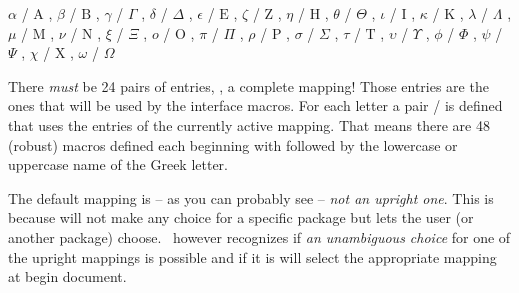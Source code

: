 \documentclass[load-preamble+]{cnltx-doc}
\begin{document}
\begin{sourcecode}
    {
      \ensuremath{\alpha}   / \ensuremath{\mathrm{A}} , %
      \ensuremath{\beta}    / \ensuremath{\mathrm{B}} , %
      \ensuremath{\gamma}   / \ensuremath{\Gamma} ,     %
      \ensuremath{\delta}   / \ensuremath{\Delta} ,     %
      \ensuremath{\epsilon} / \ensuremath{\mathrm{E}} , %
      \ensuremath{\zeta}    / \ensuremath{\mathrm{Z}} , %
      \ensuremath{\eta}     / \ensuremath{\mathrm{H}} , %
      \ensuremath{\theta}   / \ensuremath{\Theta} ,     %
      \ensuremath{\iota}    / \ensuremath{\mathrm{I}} , %
      \ensuremath{\kappa}   / \ensuremath{\mathrm{K}} , %
      \ensuremath{\lambda}  / \ensuremath{\Lambda} ,    %
      \ensuremath{\mu}      / \ensuremath{\mathrm{M}} , %
      \ensuremath{\nu}      / \ensuremath{\mathrm{N}} , %
      \ensuremath{\xi}      / \ensuremath{\Xi} ,        %
      \ensuremath{o}        / \ensuremath{\mathrm{O}} , %
      \ensuremath{\pi}      / \ensuremath{\Pi} ,        %
      \ensuremath{\rho}     / \ensuremath{\mathrm{P}} , %
      \ensuremath{\sigma}   / \ensuremath{\Sigma} ,     %
      \ensuremath{\tau}     / \ensuremath{\mathrm{T}} , %
      \ensuremath{\upsilon} / \ensuremath{\Upsilon} ,   %
      \ensuremath{\phi}     / \ensuremath{\Phi} ,       %
      \ensuremath{\psi}     / \ensuremath{\Psi} ,       %
      \ensuremath{\chi}     / \ensuremath{\mathrm{X}} , %
      \ensuremath{\omega}   / \ensuremath{\Omega}       %
  }
\end{sourcecode}

There \emph{must} be 24 pairs of entries, \ie, a complete mapping!  Those
entries are the ones that will be used by the interface macros.  For each
letter a pair / is defined that uses the entries
of the currently active mapping.  That means there are 48 (robust) macros
defined each beginning with  followed by the lowercase or
uppercase name of the Greek letter.

The default mapping is -- as you can probably see -- \emph{not an upright
  one}.  This is because \chemgreek{} will not make any choice for a specific
package but lets the user (or another package) choose.  \chemgreek\ however
recognizes if \emph{an unambiguous choice} for one of the upright mappings is
possible and if it is will select the appropriate mapping at begin document.
\end{document}
